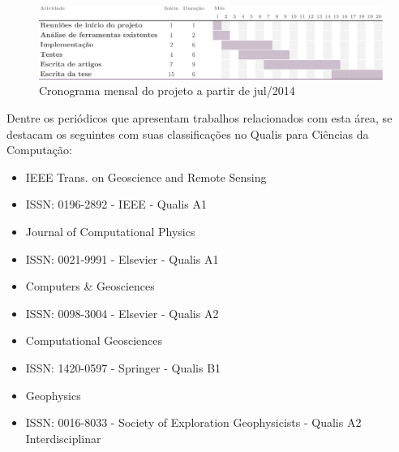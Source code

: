 \begin{figure}[htp]
\begin{center}
  \includegraphics[width=\textwidth]{fig/gantt_EQD}
  \caption{Cronograma mensal do projeto a partir de jul/2014}
  \label{fig:gantt}
\end{center}
\end{figure}

Dentre os periódicos que apresentam trabalhos relacionados com esta área, se
destacam os seguintes com suas classificações no Qualis para Ciências da
Computação:

\begin{itemize}
  \setlength{\itemsep}{0pt}
  \setlength{\parskip}{0pt}
  \item IEEE Trans. on Geoscience and Remote Sensing
  \item ISSN: 0196-2892 - IEEE - Qualis A1
\end{itemize}

\begin{itemize}
  \setlength{\itemsep}{0pt}
  \setlength{\parskip}{0pt}
  \item Journal of Computational Physics
  \item ISSN: 0021-9991 - Elsevier - Qualis A1
\end{itemize}

\begin{itemize}
  \setlength{\itemsep}{0pt}
  \setlength{\parskip}{0pt}
  \item Computers \& Geosciences
  \item ISSN: 0098-3004 - Elsevier - Qualis A2
\end{itemize}


\begin{itemize}
  \setlength{\itemsep}{0pt}
  \setlength{\parskip}{0pt}
  \item Computational Geosciences
  \item ISSN: 1420-0597 - Springer - Qualis B1
\end{itemize}


\begin{itemize}
  \setlength{\itemsep}{0pt}
  \setlength{\parskip}{0pt}
  \item Geophysics
  \item ISSN: 0016-8033 - Society of Exploration Geophysicists - Qualis A2 Interdisciplinar
\end{itemize}


